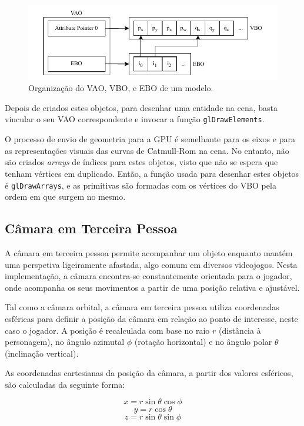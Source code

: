 \documentclass[12pt, a4paper]{article}
\begin{document}
\begin{figure}[H]
    \centering
    \includegraphics[width=\textwidth]{res/phase3/VAO.pdf}
    \caption{Organização do VAO, VBO, e EBO de um modelo.}
\end{figure}

Depois de criados estes objetos, para desenhar uma entidade na cena, basta vincular o seu VAO
correspondente e invocar a função \texttt{glDrawElements}.

O processo de envio de geometria para a GPU é semelhante para os eixos e para as representações
visuais das curvas de Catmull-Rom na cena. No entanto, não são criados \emph{arrays} de índices para
estes objetos, visto que não se espera que tenham vértices em duplicado. Então, a função usada para
desenhar estes objetos é \texttt{glDrawArrays}, e as primitivas são formadas com os vértices do VBO
pela ordem em que surgem no mesmo.

\subsection{Câmara em Terceira Pessoa}

A câmara em terceira pessoa permite acompanhar um objeto enquanto mantém uma
perspetiva ligeiramente afastada, algo comum em diversos videojogos. Nesta implementação, a câmara
encontra-se constantemente orientada para o jogador, onde acompanha os seus movimentos a partir de
uma posição relativa e ajustável.

Tal como a câmara orbital, a câmara em terceira pessoa utiliza coordenadas esféricas para definir a
posição da câmara em relação ao ponto de interesse, neste caso o jogador. A posição é recalculada
com base no raio $r$ (distância à personagem), no ângulo azimutal $\phi$ (rotação horizontal) e no
ângulo polar $\theta$ (inclinação vertical).

As coordenadas cartesianas da posição da câmara, a partir dos valores esféricos, são calculadas da
seguinte forma:

$$x = r \sin \theta \cos \phi$$
$$y = r \cos \theta$$
$$z = r \sin \theta \sin \phi$$
\end{document}

